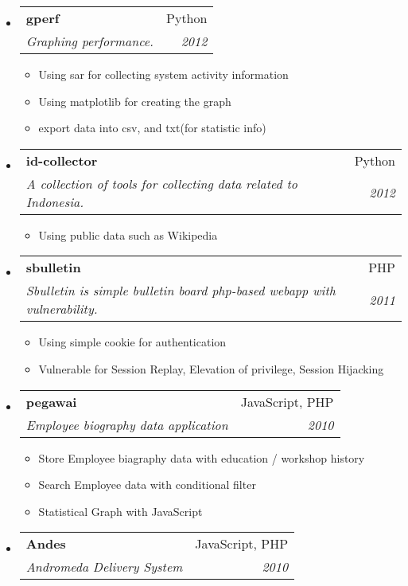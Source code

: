 \documentclass[letterpaper,11pt]{article}
\makeatletter
\newcommand{\resitem}[1]{\item #1 \vspace{-2pt}}
\newcommand{\ressubheading}[4]{

\begin{tabular*}{6.5in}{l@{\cftdotfill{\cftsecdotsep}\extracolsep{\fill}}r}

		\textbf{#1} & #2 \\

		\textit{#3} & \textit{#4} \\

\end{tabular*}\vspace{-6pt}}
\makeatother
\begin{document}
\begin{itemize}

\item \ressubheading{gperf}{Python}{Graphing performance.}{2012}

  \begin{itemize}

    \resitem{Using sar for collecting system activity information}

    \resitem{Using matplotlib for creating the graph}

    \resitem{export data into csv, and txt(for statistic info)}

  \end{itemize}

\item \ressubheading{id-collector}{Python}{A collection of tools for collecting data related to Indonesia.}{2012}

  \begin{itemize}

    \resitem{Using public data such as Wikipedia}

  \end{itemize}

\item \ressubheading{sbulletin}{PHP}{Sbulletin is simple bulletin board php-based webapp with vulnerability.}{2011}

  \begin{itemize}

    \resitem{Using simple cookie for authentication}

    \resitem{Vulnerable for Session Replay, Elevation of privilege, Session Hijacking}

  \end{itemize}

\item \ressubheading{pegawai}{JavaScript, PHP}{Employee biography data application}{2010}

  \begin{itemize}

	\resitem{Store Employee biagraphy data with education / workshop history}

	\resitem{Search Employee data with conditional filter}

	\resitem{Statistical Graph with JavaScript}


	\end{itemize}


\item \ressubheading{Andes}{JavaScript, PHP}{Andromeda Delivery System}{2010}


\end{itemize}
\end{document}
